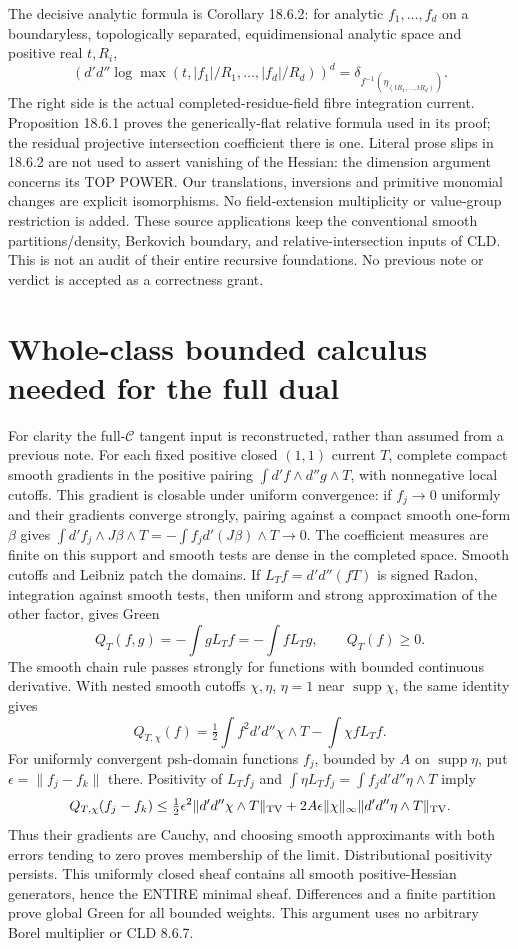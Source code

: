 \documentclass[11pt]{article}
\newcommand{\DD}{d'd''}
\newcommand{\C}{\mathcal C}
\begin{document}
The decisive analytic formula is Corollary 18.6.2: for analytic
$f_1,\ldots,f_d$ on a boundaryless, topologically separated,
equidimensional analytic space and positive real $t,R_i$,
\begin{equation}\label{fibre}
 (\DD\log\max(t,|f_1|/R_1,\ldots,|f_d|/R_d))^d
 =\delta_{f^{-1}(\eta_{(tR_1,\ldots,tR_d)})}.
\end{equation}
The right side is the actual completed-residue-field fibre integration
current. Proposition 18.6.1 proves the generically-flat relative formula
used in its proof; the residual projective intersection coefficient there
is one. Literal prose slips in 18.6.2 are not used to assert vanishing of
the Hessian: the dimension argument concerns its TOP POWER. Our
translations, inversions and primitive monomial changes are explicit
isomorphisms. No field-extension multiplicity or value-group restriction
is added. These source applications keep the conventional smooth
partitions/density, Berkovich boundary, and relative-intersection inputs
of CLD. This is not an audit of their entire recursive foundations.
No previous note or verdict is accepted as a correctness grant.

\section*{Whole-class bounded calculus needed for the full dual}
For clarity the full-$\C$ tangent input is reconstructed, rather than
assumed from a previous note. For each fixed positive closed $(1,1)$
current $T$, complete compact smooth gradients in the positive pairing
$\int d'f\wedge d''g\wedge T$, with nonnegative local cutoffs.
This gradient is closable under uniform convergence: if $f_j\to0$
uniformly and their gradients converge strongly, pairing against a compact
smooth one-form $\beta$ gives
$\int d'f_j\wedge J\beta\wedge T=-\int f_jd'(J\beta)\wedge T\to0$.
The coefficient measures are finite on this support and smooth tests are
dense in the completed space. Smooth cutoffs and Leibniz patch the domains.
If $L_Tf=\DD(fT)$ is signed Radon, integration against smooth tests,
then uniform and strong approximation of the other factor, gives Green
\[
 Q_T(f,g)=-\int gL_Tf=-\int fL_Tg,\qquad Q_T(f)\ge0.
\]
The smooth chain rule passes strongly for functions with bounded continuous
derivative. With nested smooth cutoffs $\chi,\eta$, $\eta=1$ near
$\operatorname{supp}\chi$, the same identity gives
\[
 Q_{T,\chi}(f)=\tfrac12\int f^2\DD\chi\wedge T-\int\chi fL_Tf.
\]
For uniformly convergent psh-domain functions $f_j$, bounded by $A$ on
$\operatorname{supp}\eta$, put $\epsilon=\|f_j-f_k\|$ there.
Positivity of $L_Tf_j$ and
$\int\eta L_Tf_j=\int f_j\DD\eta\wedge T$ imply
\[
 Q_{T,\chi}(f_j-f_k)\le
 \tfrac12\epsilon^2\|\DD\chi\wedge T\|_{\rm TV}
 +2A\epsilon\|\chi\|_\infty\|\DD\eta\wedge T\|_{\rm TV}.
\]
Thus their gradients are Cauchy, and choosing smooth approximants with
both errors tending to zero proves membership of the limit. Distributional
positivity persists. This uniformly closed sheaf contains all smooth
positive-Hessian generators, hence the ENTIRE minimal sheaf. Differences
and a finite partition prove global Green for all bounded weights.
This argument uses no arbitrary Borel multiplier or CLD 8.6.7.
\end{document}
